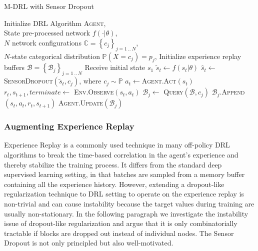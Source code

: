 \documentclass[../thesis.tex]{subfiles}
\begin{document}
\begin{algorithm}[t]
    \caption{M-DRL with Sensor Dropout}
    \label{alg:mdrl-algo}
\begin{algorithmic}
     Initialize DRL Algorithm \textsc{Agent},\\
    \qquad \quad State pre-processed network $f(\cdot|\theta)$, \\
    \qquad \quad $N$ network configurations $\mathbb{C}= \left\{c_j\right\}_{j=1~..~N}$,\\
    \qquad \quad $N$-state categorical distribution $\mathbb{P}(X=c_j) = p_j$,
    \STATE Initialize experience replay buffers $\mathcal{B} = \left\{\mathcal{B}_j\right\}_{j=1~..~N}$
     \STATE Receive initial state $s_1$
        \STATE $\tilde{s}_t \leftarrow f(s_t|\theta)$
        \STATE $\hat{s}_t \leftarrow$ \textsc{SensorDropout}$(\tilde{s}_t , c_j)$, where $c_j \sim \mathbb{P}$
        \STATE $a_t \leftarrow $\textsc{Agent.Act}$(\hat{s}_t)$ 
        \STATE $r_t,s_{t+1},terminate \leftarrow$ \textsc{Env.Observe}$(s_t, a_t)$ 
        \STATE $\mathcal{B}_j \leftarrow$ \textsc{Query}$(\mathcal{B},c_j)$
        \STATE $\mathcal{B}_j.$\textsc{Append}$(s_t, a_t, r_t, s_{t+1})$
        \STATE \textsc{Agent.Update}$(\mathcal{B}_j)$
     \ENDFOR
    \ENDFOR
\end{algorithmic}
\end{algorithm}

\subsubsection{Augmenting Experience Replay}
Experience Replay is a commonly used technique in many off-policy DRL algorithms to break the time-based correlation in the agent's experience and thereby stabilize the training process. It differs from the standard deep supervised learning setting, in that batches are sampled from a memory buffer containing all the experience history. However, extending a dropout-like regularization technique to DRL setting to operate on the experience replay is non-trivial and can cause instability because the target values during training are usually non-stationary. In the following paragraph we investigate the instability issue of dropout-like regularization and argue that it is only combinatorially tractable if blocks are dropped out instead of individual nodes. The Sensor Dropout is not only principled but also well-motivated.
\end{document}

